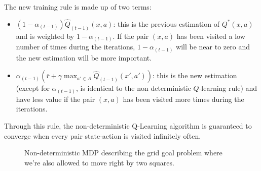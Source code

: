 \documentclass[a4paper, 12pt]{report}
\begin{document}
    The new training rule is made up of two terms:
    \begin{itemize}
        \item $(1-\alpha_{(t-1)}) \widehat{Q}_{(t-1)}(x, a)$: this is the previous estimation of $Q^*(x,a)$ and is weighted by $1-\alpha_{(t-1)}$. If the pair $(x,a)$ has been visited a low number of times during the iterations, $1-\alpha_{(t-1)}$ will be near to zero and the new estimation will be more important.
        \item $\alpha_{(t-1)}(\overline{r} + \gamma \max_{a' \in A} \widehat{Q}_{(t-1)}(x', a'))$: this is the new estimation (except for $\alpha_{(t-1)}$, is identical to the non deterministic $Q$-learning rule) and have less value if the pair $(x,a)$ has been visited more times during the iterations. 
    \end{itemize}

    Through this rule, the non-deterministic Q-Learning algorithm is guaranteed to converge when every pair state-action is visited infinitely often.

    \begin{figure}[H]
        \centering

        \caption{Non-deterministic MDP describing the grid goal problem where we're also allowed to move right by two squares.}
    \end{figure}
\end{document}
